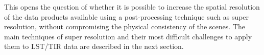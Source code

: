         This opens the question of whether it is possible to increase the spatial resolution of the data products available using a post-processing technique such as super resolution, without compromising the physical consistency of the scenes.
        The main techniques of super resolution and their most difficult challenges to apply them to LST/TIR data are described in the next section.

\newpage